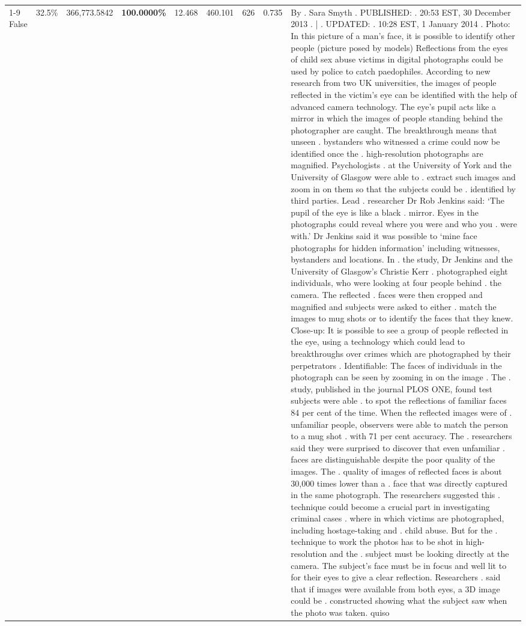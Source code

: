 \begin{table}[H]
\begin{tabular}{lllrlllll}
\cline{1-9}
False & 32.5\% & 366,773.5842 & \bfseries \color{red} 100.0000\% & 12.468 & 460.101 & 626 & 0.735 & By . Sara Smyth . PUBLISHED: . 20:53 EST, 30 December 2013 . | . UPDATED: . 10:28 EST, 1 January 2014 . Photo: In this picture of a man's face, it is possible to identify other people (picture posed by models) Reflections from the eyes of child sex abuse victims in digital photographs could be used by police to catch paedophiles. According to new research from two UK universities, the images of people reflected in the victim's eye can be identified with the help of advanced camera technology. The eye's pupil acts like a mirror in which the images of people standing behind the photographer are caught. The breakthrough means that unseen . bystanders who witnessed a crime could now be identified once the . high-resolution photographs are magnified. Psychologists . at the University of York and the University of Glasgow were able to . extract such images and zoom in on them so that the subjects could be . identified by third parties. Lead . researcher Dr Rob Jenkins said: ‘The pupil of the eye is like a black . mirror. Eyes in the photographs could reveal where you were and who you . were with.' Dr Jenkins said it was possible to ‘mine face photographs for hidden information' including witnesses, bystanders and locations. In . the study, Dr Jenkins and the University of Glasgow's Christie Kerr . photographed eight individuals, who were looking at four people behind . the camera. The reflected . faces were then cropped and magnified and subjects were asked to either . match the images to mug shots or to identify the faces that they knew. Close-up: It is possible to see a group of people reflected in the eye, using a technology which could lead to breakthroughs over crimes which are photographed by their perpetrators . Identifiable: The faces of individuals in the photograph can be seen by zooming in on the image . The . study, published in the journal PLOS ONE, found test subjects were able . to spot the reflections of familiar faces 84 per cent of the time. When the reflected images were of . unfamiliar people, observers were able to match the person to a mug shot . with 71 per cent accuracy. The . researchers said they were surprised to discover that even unfamiliar . faces are distinguishable despite the poor quality of the images. The . quality of images of reflected faces is about 30,000 times lower than a . face that was directly captured in the same photograph. The researchers suggested this . technique could become a crucial part in investigating criminal cases . where in which victims are photographed, including hostage-taking and . child abuse. But for the . technique to work the photos has to be shot in high-resolution and the . subject must be looking directly at the camera. The subject's face must be in focus and well lit to for their eyes to give a clear reflection. Researchers . said that if images were available from both eyes, a 3D image could be . constructed showing what the subject saw when the photo was taken. quiso \\

\end{tabular}
\end{table}
